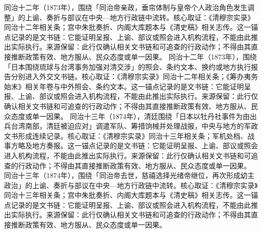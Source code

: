 同治十二年（1873年），围绕「同治帝亲政，垂帘体制与皇帝个人政治角色发生调整」的上谕、奏折与部议在中央—地方行政链中流转。核心取证：《清穆宗实录》同治十二年相关条；宫中朱批奏折、内阁大库题本与《清史稿》相关志传。这一锚点记录的是文书链：它能证明呈报、上谕、部议或照会进入机构流程，不能由此推出实际执行。来源保留：此行仅确认相关文书链和可追查的行政动作；不得由其直接推断政策有效、地方服从、民众态度或单一因果。
同治十二年（1873年），围绕「日本围绕琉球与台湾事务加强对清交涉」的照会、条约文本、换约或地方执行报告分别进入外交文书链。核心取证：《清穆宗实录》同治十二年相关条；《筹办夷务始末》相关年卷与中外照会、条约文本。这一锚点记录的是文书链：它能证明呈报、上谕、部议或照会进入机构流程，不能由此推出实际执行。来源保留：此行仅确认相关文书链和可追查的行政动作；不得由其直接推断政策有效、地方服从、民众态度或单一因果。
同治十三年（1874年），清廷围绕「日本以牡丹社事件为由出兵台湾南部，清廷被迫应对」调遣军队、筹措饷械并处理战报，中央与地方的军政文书形成连续记录。核心取证：《清穆宗实录》同治十三年相关条；军机处档、战事方略及地方奏报。这一锚点记录的是文书链：它能证明呈报、上谕、部议或照会进入机构流程，不能由此推出实际执行。来源保留：此行仅确认相关文书链和可追查的行政动作；不得由其直接推断政策有效、地方服从、民众态度或单一因果。
同治十三年（1874年），围绕「同治帝去世，慈禧选择光绪帝继位，再次形成幼主政治」的上谕、奏折与部议在中央—地方行政链中流转。核心取证：《清穆宗实录》同治十三年相关条；宫中朱批奏折、内阁大库题本与《清史稿》相关志传。这一锚点记录的是文书链：它能证明呈报、上谕、部议或照会进入机构流程，不能由此推出实际执行。来源保留：此行仅确认相关文书链和可追查的行政动作；不得由其直接推断政策有效、地方服从、民众态度或单一因果。
